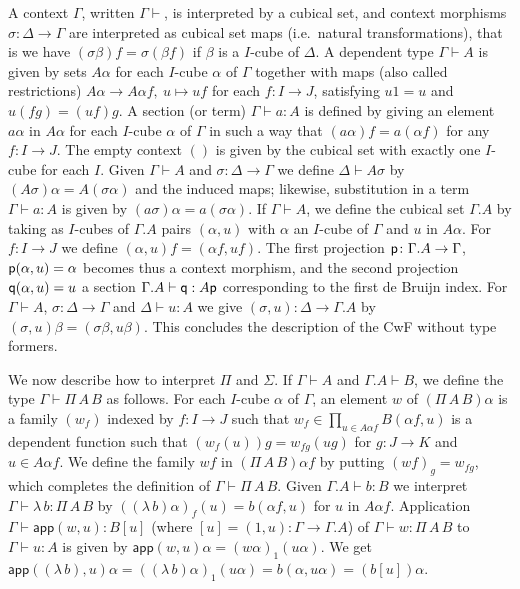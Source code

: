 \documentclass[10pt,a4paper]{article}
\newcommand{\app}{\mathsf{app}}
\newcommand{\pp}{{\sf p}}
\newcommand{\qq}{{\sf q}}
\begin{document}
A context $\Gamma$, written $\Gamma \vdash$, is interpreted by a
cubical set, and context morphisms $\sigma:\Delta\to\Gamma$ are
interpreted as cubical set maps (i.e.\ natural transformations), that
is we have $(\sigma\beta)f = \sigma(\beta f)$ if $\beta$ is a $I$-cube
of $\Delta$.  A dependent type $\Gamma\vdash A$ is given by sets
$A\alpha$ for each $I$-cube $\alpha$ of $\Gamma$ together with maps
(also called restrictions) $A\alpha\to A\alpha f,~u\longmapsto uf$ for
each $f \colon I \to J$, satisfying $u1 = u$ and $u(fg) = (uf)g$.  A
section (or term) $\Gamma\vdash a:A$ is defined by giving an element
$a\alpha$ in $A\alpha$ for each $I$-cube $\alpha$ of $\Gamma$ in such
a way that $(a\alpha) f = a (\alpha f)$ for any $f \colon I \to J$.
The empty context $()$ is given by the cubical set with exactly one
$I$-cube for each $I$.  Given $\Gamma \vdash A$ and $\sigma \colon
\Delta \to \Gamma$ we define $\Delta \vdash A \sigma$ by $(A \sigma)
\alpha = A (\sigma \alpha)$ and the induced maps; likewise,
substitution in a term $\Gamma \vdash a : A$ is given by $(a \sigma)
\alpha = a (\sigma \alpha)$.  If $\Gamma\vdash A$, we define the
cubical set $\Gamma.A$ by taking as $I$-cubes of $\Gamma.A$ pairs
$(\alpha,u)$ with $\alpha$ an $I$-cube of $\Gamma$ and $u$ in
$A\alpha$. For $f:I\to J$ we define $(\alpha,u)f = (\alpha f,u f)$.
The first projection $\pp \colon \Gamma.A \to \Gamma$, $\pp (\alpha,
u) = \alpha$ becomes thus a context morphism, and the second
projection $\qq (\alpha, u) = u$ a section $\Gamma.A \vdash \qq : A
\pp$ corresponding to the first de Bruijn index.  For $\Gamma \vdash
A$, $\sigma \colon \Delta \to \Gamma$ and $\Delta \vdash u : A$ we
give $(\sigma, u) \colon \Delta \to \Gamma.A$ by $(\sigma, u) \beta =
(\sigma \beta, u \beta)$.  This concludes the description of the CwF
without type formers.

We now describe how to interpret $\Pi$ and $\Sigma$. If $\Gamma\vdash
A$ and $\Gamma.A\vdash B$, we define the type $\Gamma\vdash \Pi\,A\,B$
as follows.  For each $I$-cube $\alpha$ of $\Gamma$, an element $w$ of
$(\Pi\,A\,B)\alpha$ is a family $(w_f)$ indexed by $f:I\to J$ such
that $w_f \in \prod_{u \in A \alpha f} B (\alpha f, u)$ is a dependent
function such that $(w_f (u)) g = w_{fg} (u g)$ for $g \colon J \to K$
and $u \in A \alpha f$.  We define the family $wf$ in $(\Pi\,A\,B)
\alpha f$ by putting $(wf)_g = w_{fg}$, which completes the definition
of $\Gamma\vdash \Pi\,A\,B$.  Given $\Gamma.A \vdash b : B$ we
interpret $\Gamma \vdash \lambda\,b : \Pi\,A\,B$ by $ ((\lambda\, b)
\alpha)_f (u) = b (\alpha f, u)$ for $u$ in $A \alpha f$.  Application
$\Gamma \vdash \app (w,u) : B [u]$ (where $[u] = (1, u) \colon \Gamma
\to \Gamma.A$) of $\Gamma \vdash w : \Pi\,A\,B$ to $\Gamma \vdash u :
A$ is given by $\app (w, u) \alpha = (w\alpha)_1 (u\alpha)$.  We get
$\app ((\lambda\,b), u) \alpha = ((\lambda\,b) \alpha)_1 (u \alpha) =
b (\alpha, u\alpha) = (b [u]) \alpha$.
\end{document}
